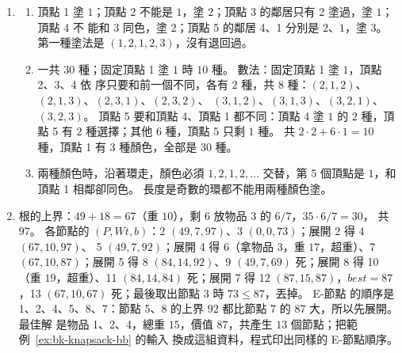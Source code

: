 \begin{enumerate}
\item
\begin{enumerate}
\item 頂點 1 塗 $1$；頂點 2 不能是 $1$，塗 $2$；頂點 3 的鄰居只有 2 塗過，塗 $1$；頂點 4 不
能和 3 同色，塗 $2$；頂點 5 的鄰居 4、1 分別是 $2$、$1$，塗 $3$。 第一種塗法是
$(1, 2, 1, 2, 3)$，沒有退回過。
\item 一共 $30$ 種；固定頂點 1 塗 $1$ 時 $10$ 種。 數法：固定頂點 1 塗 $1$，頂點 2、3、4 依
序只要和前一個不同，各有 $2$ 種，共 $8$ 種：$(2,1,2)$、$(2,1,3)$、$(2,3,1)$、$(2,3,2)$、
$(3,1,2)$、$(3,1,3)$、$(3,2,1)$、$(3,2,3)$。 頂點 5 要和頂點 4、頂點 1 都不同：頂點 4 塗 $1$
的 $2$ 種，頂點 5 有 $2$ 種選擇；其他 $6$ 種，頂點 5 只剩 $1$ 種。 共 $2 \cdot 2 + 6 \cdot 1 = 10$
種，頂點 1 有 $3$ 種顏色，全部是 $30$ 種。
\item 兩種顏色時，沿著環走，顏色必須 $1, 2, 1, 2, \ldots$ 交替，第 5 個頂點是 $1$，和頂點 1
相鄰卻同色。 長度是奇數的環都不能用兩種顏色塗。
\end{enumerate}

\item 根的上界：$49 + 18 = 67$（重 $10$），剩 $6$ 放物品 3 的 $6/7$，$35 \cdot 6 / 7 = 30$，
共 $97$。 各節點的 $(P, \mathit{Wt}, b)$：2 $(49, 7, 97)$、3 $(0, 0, 73)$；展開 2 得 4 $(67, 10, 97)$、
5 $(49, 7, 92)$；展開 4 得 6（拿物品 3，重 $17$，超重）、7 $(67, 10, 87)$；展開 5 得 8 $(84, 14,
92)$、9 $(49, 7, 69)$ 死；展開 8 得 10（重 $19$，超重）、11 $(84, 14, 84)$ 死；展開 7 得 12 $(87,
15, 87)$，$\mathit{best} = 87$，13 $(67, 10, 67)$ 死；最後取出節點 3 時 $73 \le 87$，丟掉。 E-節點
的順序是 1、2、4、5、8、7：節點 5、8 的上界 $92$ 都比節點 7 的 $87$ 大，所以先展開。 最佳解
是物品 1、2、4，總重 $15$，價值 $87$，共產生 $13$ 個節點；把範例~\ref{ex:bk-knapsack-bb} 的輸入
換成這組資料，程式印出同樣的 E-節點順序。


\end{enumerate}
